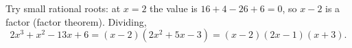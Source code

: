 Try small rational roots: at $x=2$ the value is $16+4-26+6=0$, so $x-2$ is a factor (factor theorem). Dividing,
\[2x^3+x^2-13x+6=(x-2)\left(2x^2+5x-3\right)=\boxed{(x-2)(2x-1)(x+3)}.\]
